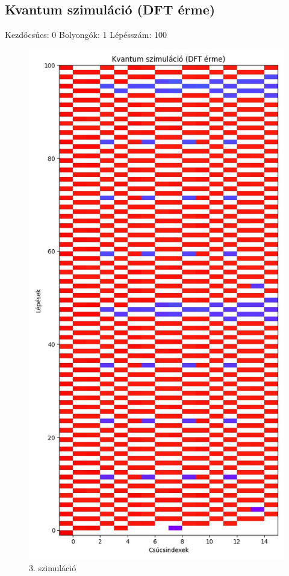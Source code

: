 \documentclass[14pt,a4paper]{article}
\begin{document}
\subsection{Kvantum szimuláció (DFT érme)}
Kezdőcsúcs: 0
Bolyongók: 1
Lépésszám: 100
\begin{figure}[H]
\centering
\includegraphics[width = 0.7\columnwidth]{sim_03/counts.jpg}
\caption{3. szimuláció}
\end{figure}
\end{document}

